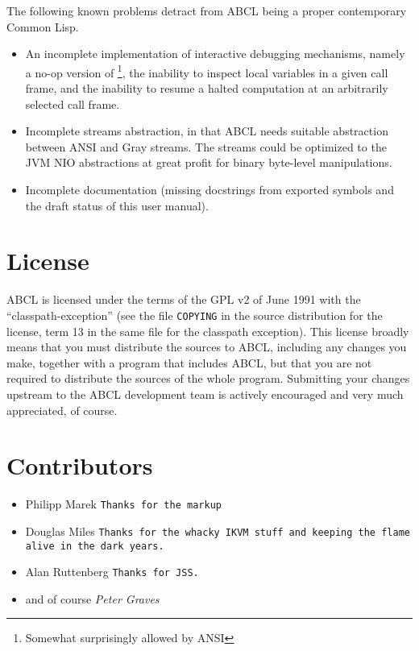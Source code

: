 \documentclass[10pt]{book}
\begin{document}
The following known problems detract from \textsc{ABCL} being a proper
contemporary Common Lisp.
\begin{itemize}
\item An incomplete implementation of interactive debugging mechanisms,
  namely a no-op version of  \footnote{Somewhat surprisingly
    allowed by \textsc{ANSI}}, the inability to inspect local variables
  in a given call frame, and the inability to resume a halted
  computation at an arbitrarily selected call frame.
\item Incomplete streams abstraction, in that \textsc{ABCL} needs
  suitable abstraction between ANSI and Gray streams.  The streams could
  be optimized to the JVM NIO abstractions at great profit for binary
  byte-level manipulations.
\item Incomplete documentation (missing docstrings from exported symbols
  and the draft status of this user manual).
\end{itemize}



\section{License}

ABCL is licensed under the terms of the GPL v2 of June 1991 with the
``classpath-exception'' (see the file \texttt{COPYING} in the source
distribution for the license, term 13 in the same file for the classpath
exception).  This license broadly means that you must distribute the
sources to ABCL, including any changes you make, together with a program
that includes ABCL, but that you are not required to distribute the
sources of the whole program.  Submitting your changes upstream to the
ABCL development team is actively encouraged and very much appreciated,
of course.

\section{Contributors}

\begin{itemize}
\item Philipp Marek \texttt{Thanks for the markup}
\item Douglas Miles \texttt{Thanks for the whacky IKVM stuff and keeping the flame alive
  in the dark years.}
\item Alan Ruttenberg \texttt{Thanks for JSS.}
\item and of course
\emph{Peter Graves}
\end{itemize}
\end{document}
